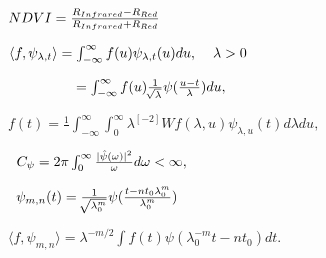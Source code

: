 \documentclass[16pt]{article}
\begin{document}
$NDVI=\frac{R_{Infrared}-R_{Red}}{R_{Infrared}+R_{Red}}\hspace{4mm}$
\vspace{1cm}

$\langle f,\psi_{\lambda,t}\rangle=\int_{-\infty}^{\infty}f(u)\psi_{\lambda,t}(u)du,\hspace{4mm}\lambda>0$
\vspace{1cm}

$\hspace{17mm}=\int_{-\infty}^{\infty}f(u)\frac{1}{\sqrt[]{\lambda}}\psi(\frac{u-t}{\lambda})du,$
\vspace{1cm}

$f(t)=\frac{1}{}\int_{-\infty}^{\infty}\int_{0}^{\infty}\lambda^{[-2]}Wf(\lambda,u)\psi_{\lambda,u}(t)d\lambda du,$
\vspace{1cm}

$\hspace{2mm}C_\psi=2\pi\int_{0}^{\infty}\frac{|
\hat{\psi}(\omega)|^{2}}{\omega}d\omega<\infty,$
\vspace{1cm}

$\hspace{2mm}\psi_{m,n}(t)=\frac{1}{\sqrt[]{\lambda^{m}_0}}\psi(\frac{t-nt_0\lambda^{m}_0}{\lambda^{m}_0})$
\vspace{1cm}

$\langle f,\psi_{m,n}\rangle=\lambda^{-m/2}\int f(t)\psi(\lambda_0^{-m}t-nt_0)dt.$
\vspace{1cm}
\end{document}
